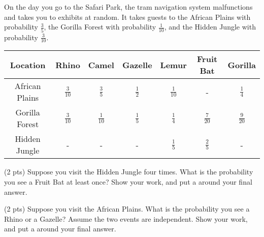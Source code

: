 \documentclass[twoside,12pt]{article}
\begin{document}
\begin{probset}
\begin{prob}[(11 pts)]
    On the day you go to the Safari Park, the tram navigation system malfunctions and takes you to exhibits at random. It takes guests to the African Plains with probability $\frac{3}{5}$, the Gorilla Forest with probability $\frac{1}{10}$, and the Hidden Jungle with probability $\frac{3}{10}$. 

\begin{table}[h!]
    \centering
    \renewcommand{\arraystretch}{1.6}
    \begin{tabular}{|c|c|c|c|c|c|c|}
        \hline
        \textbf{Location} & \textbf{Rhino} & \textbf{Camel} & \textbf{Gazelle} & \textbf{Lemur}  & \textbf{Fruit Bat}  & \textbf{Gorilla} \\ \hline
        African Plains  & \(\frac{3}{10}\) & \(\frac{3}{5}\) & \(\frac{1}{2}\) & \(\frac{1}{10}\) &  -       & \(\frac{1}{4}\)    \\ \hline
        Gorilla Forest & \(\frac{3}{10}\) & \(\frac{1}{10}\)    & \(\frac{1}{5}\)  & \(\frac{1}{4}\) & \(\frac{7}{20}\)  & \(\frac{9}{20}\) \\ \hline
        Hidden Jungle  & -    & -    & -    & \(\frac{1}{5}\) &  \(\frac{2}{5}\)   & -    \\ \hline
    \end{tabular}    %
    \label{tab:animal_probs_transposed}
\end{table}
\vspace{-0.3cm}
\begin{subprobset}
    \begin{subprob}(2 pts)
        Suppose you visit the Hidden Jungle four times. What is the probability you see a Fruit Bat at least once? Show your work, and put a  around your final answer.

        \begin{responsebox}{0.9in}
            
        \end{responsebox}
    \end{subprob}

    \begin{subprob}(2 pts)
        Suppose you visit the African Plains. What is the probability you see a Rhino or a Gazelle? Assume the two events are independent. Show your work, and put a  around your final answer.

        \begin{responsebox}{0.9in}
            

\end{responsebox}
\end{subprob}
\end{subprobset}
\end{prob}
\end{probset}
\end{document}
